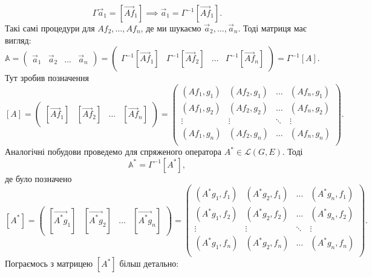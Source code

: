 \documentclass{math_library}
\begin{document}
\[
\Gamma \vec{a}_1 = [\overrightarrow{Af}_1] \implies \vec{a}_1 = \Gamma^{-1} [\overrightarrow{Af}_1].
\]
Такі самі процедури для $Af_2,\dots,Af_n$, де ми шукаємо $\vec{a}_2, \dots, \vec{a}_n$. Тоді матриця має вигляд:
\[
\mathbb{A} = \begin{pmatrix}
\vec{a}_1 & \vec{a}_2 & \dots & \vec{a}_n
\end{pmatrix} = \begin{pmatrix}
\Gamma^{-1} [\overrightarrow{Af}_1] & \Gamma^{-1} [\overrightarrow{Af}_2] & \dots & \Gamma^{-1} [\overrightarrow{Af}_n]
\end{pmatrix} = \Gamma^{-1} [A].
\]
Тут зробив позначення 
\[
[A] = \begin{pmatrix}
[\overrightarrow{Af}_1] & [\overrightarrow{Af}_2] & \dots & [\overrightarrow{Af}_n]
\end{pmatrix} = \begin{pmatrix}
(Af_1,g_1) & (Af_2,g_1) & \dots & (Af_n,g_1) \\
(Af_1,g_2) & (Af_2,g_2) & \dots & (Af_n,g_2) \\
\vdots & \vdots & \ddots & \vdots \\
(Af_1,g_n) & (Af_2,g_n) & \dots & (Af_n,g_n) \\
\end{pmatrix}.
\]
Аналогічні побудови проведемо для спряженого оператора $A^* \in \mathcal{L}(G,E)$. Тоді 
\[
\mathbb{A}^* = \Gamma^{-1} [A^*],
\] 
де було позначено
\[
[A^*] = \begin{pmatrix}
[\overrightarrow{A^*g}_1] & [\overrightarrow{A^*g}_2] & \dots & [\overrightarrow{A^*g}_n]
\end{pmatrix} = \begin{pmatrix}
(A^*g_1,f_1) & (A^*g_2,f_1) & \dots & (A^*g_n,f_1) \\
(A^*g_1,f_2) & (A^*g_2,f_2) & \dots & (A^*g_n,f_2) \\
\vdots & \vdots & \ddots & \vdots \\
(A^*g_1,f_n) & (A^*g_2,f_n) & \dots & (A^*g_n,f_n) \\
\end{pmatrix}.
\]
Пограємось з матрицею $[A^*]$ більш детально:
\end{document}
